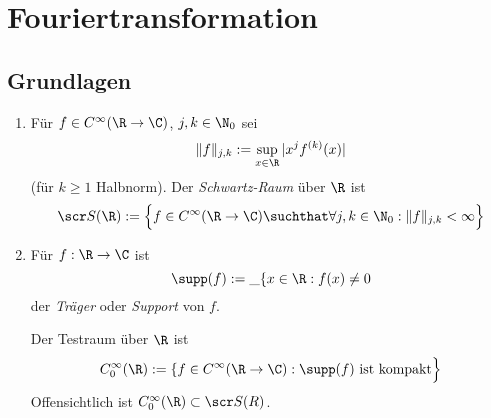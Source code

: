 
\chapter{Fouriertransformation}

\section{Grundlagen}


\begin{df} \label{4.1}
	\begin{enumerate}[1)]
		\item
			Für $f \in C^\infty(\R \to \C)$, $j,k \in \N_0$ sei
			\[
				\|f\|_{j,k} := \sup_{x\in \R} |x^j f^{(k)}(x)|
			\]
			(für $k \ge 1$ Halbnorm).
			Der \emph{Schwartz-Raum} über $\R$ ist
			\[
				\scr S (\R) := \Big\{ f \in C^\infty(\R \to \C) \suchthat  \forall j,k \in \N_0 : \|f\|_{j,k} < \infty \Big\}
			\]
		\item
			Für $f : \R \to \C$ ist
			\[
				\supp(f) := \_{\{x \in \R : f(x) \neq 0}
			\]
			der \emph{Träger} oder \emph{Support} von $f$.

			Der Testraum über $\R$ ist
			\[
				C_0^\infty(\R) := \{f \in C^\infty(\R\to\C) : \supp(f) \text{ ist kompakt} \Big\}
			\]
			Offensichtlich ist $C_0^\infty (\R) \subset \scr S(R)$.
	\end{enumerate}
\end{df}

